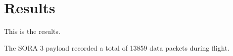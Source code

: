 \section{Results}
\label{sec:Results}

This is the results.

The SORA 3 payload recorded a total of 13859 data packets during flight.
